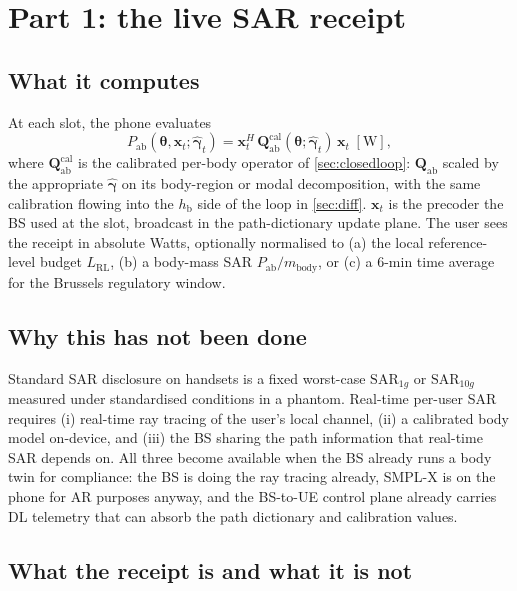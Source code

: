 \documentclass[11pt,a4paper]{article}
\theoremstyle{definition}
\newcommand{\Qabs}{\mathbf{Q}_{\mathrm{ab}}}
\newcommand{\xvec}{\mathbf{x}}
\newcommand{\thetab}{\bm{\theta}}
\newcommand{\Pabs}{P_{\mathrm{ab}}}
\newcommand{\hbody}{h_{\mathrm{b}}}
\begin{document}
\section{Part 1: the live SAR receipt}\label{sec:saridx}

\subsection{What it computes}

At each slot, the phone evaluates
\begin{equation}\label{eq:sar-receipt}
  \Pabs(\thetab,\xvec_t;\hat{\bm\gamma}_t)
  = \xvec_t^H\,\Qabs^{\mathrm{cal}}(\thetab;\hat{\bm\gamma}_t)\,\xvec_t
  \;[\mathrm{W}],
\end{equation}
where $\Qabs^{\mathrm{cal}}$ is the calibrated per-body operator
of \cref{sec:closedloop}: $\Qabs$ scaled by the appropriate
$\hat{\bm\gamma}$ on its body-region or modal decomposition, with
the same calibration flowing into the $\hbody$ side of the loop
in \cref{sec:diff}.  $\xvec_t$ is the precoder the BS used at the
slot, broadcast in the path-dictionary update plane.  The user
sees the receipt in absolute Watts, optionally normalised to (a)
the local reference-level budget $L_{\mathrm{RL}}$, (b) a body-mass
SAR $\Pabs/m_{\mathrm{body}}$, or (c) a 6-min time average for the
Brussels regulatory window.

\subsection{Why this has not been done}

Standard SAR disclosure on handsets is a fixed worst-case
$\mathrm{SAR}_{1g}$ or $\mathrm{SAR}_{10g}$ measured under
standardised conditions in a phantom.  Real-time per-user SAR
requires (i) real-time ray tracing of the user's local channel,
(ii) a calibrated body model on-device, and (iii) the BS sharing
the path information that real-time SAR depends on.  All three
become available when the BS already runs a body twin for
compliance: the BS is doing the ray tracing already, SMPL-X is on
the phone for AR purposes anyway, and the BS-to-UE control plane
already carries DL telemetry that can absorb the path dictionary
and calibration values.

\subsection{What the receipt is and what it is not}
\end{document}
